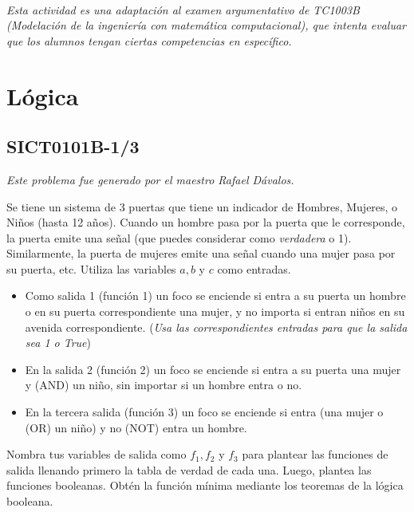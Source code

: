 \documentclass{article}
\title{
    \myclass \\
    \textbf{\mytitle} \\
    \date{}
}
\begin{document}
\maketitle

\vspace{-1.5cm}

{%
\footnotesize
\textit{Esta actividad es una adaptación al examen argumentativo de TC1003B (Modelación de la ingeniería con matemática computacional), que intenta evaluar que los alumnos tengan ciertas competencias en específico.}

\section{Lógica}

\subsection{SICT0101B-1/3}

\textit{\footnotesize Este problema fue generado por el maestro Rafael Dávalos.}

\vspace{2.5ex}

Se tiene un sistema de 3 puertas que tiene un indicador de Hombres, Mujeres, o Niños (hasta 12 años).
Cuando un hombre pasa por la puerta que le corresponde, la puerta emite una señal (que puedes considerar como \textit{verdadera} o 1).
Similarmente, la puerta de mujeres emite una señal cuando una mujer pasa por su puerta, etc.
Utiliza las variables $a, b$ y $c$ como entradas.

\begin{itemize}
    \item Como salida 1 (función 1) un foco se enciende si entra a su puerta un hombre o en su puerta correspondiente una mujer, y no importa si entran niños en su avenida correspondiente.
    (\textit{\footnotesize Usa las correspondientes entradas para que la salida sea 1 o True})
    \item En la salida 2 (función 2) un foco se enciende si entra a su puerta una mujer y (AND) un niño, sin importar si un hombre entra o no.
    \item En la tercera salida (función 3) un foco se enciende si entra (una mujer o (OR) un niño) y no (NOT)  entra un hombre.
\end{itemize}

Nombra tus variables de salida como $f_1, f_2$ y $f_3$ para plantear las funciones de salida llenando primero la tabla de verdad de cada una. Luego, plantea las funciones booleanas.
Obtén la función mínima mediante los teoremas de la lógica booleana.

}
\end{document}
